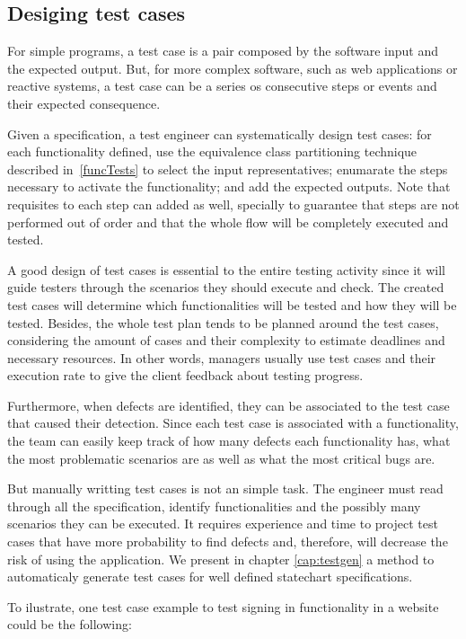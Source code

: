 \subsection{Desiging test cases}
\label{sec:testcasesdesign}


For simple programs, a test case is a pair composed by the software input and the expected output. But, for more complex software, such as web applications or reactive systems, a test case can be a series os consecutive steps or events and their expected consequence.

Given a specification, a test engineer can systematically design test cases: for each functionality defined, use the equivalence class partitioning technique described in~\ref{funcTests} to select the input representatives; enumarate the steps necessary to activate the functionality; and add the expected outputs. Note that requisites to each step can added as well, specially to guarantee that steps are not performed out of order and that the whole flow will be completely executed and tested.

A good design of test cases is essential to the entire testing activity since it will guide testers through the scenarios they should execute and check. The created test cases will determine which functionalities will be tested and how they will be tested. Besides, the whole test plan tends to be planned around the test cases, considering the amount of cases and their complexity to estimate deadlines and necessary resources. In other words, managers usually use test cases and their execution rate to give the client feedback about testing progress.

Furthermore, when defects are identified, they can be associated to the test case that caused their detection. Since each test case is associated with a functionality, the team can easily keep track of how many defects each functionality has, what the most problematic scenarios are as well as what the most critical bugs are.

But manually writting test cases is not an simple task. The engineer must read through all the specification, identify functionalities and the possibly many scenarios they can be executed. It requires experience and time to project test cases that have more probability to find defects and, therefore, will decrease the risk of using the application. We present in chapter \ref{cap:testgen} a method to automaticaly generate test cases for well defined statechart specifications.

To ilustrate, one test case example to test signing in functionality in a website could be the following:

